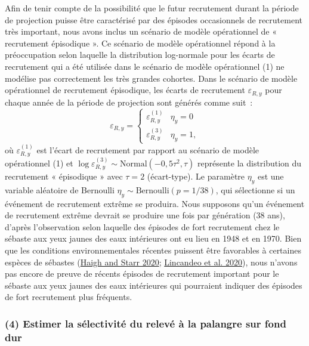 \documentclass[11pt]{book}
\begin{document}
Afin de tenir compte de la possibilité que le futur recrutement durant la période de projection puisse être caractérisé par des épisodes occasionnels de recrutement très important, nous avons inclus un scénario de modèle opérationnel de « recrutement épisodique ». Ce scénario de modèle opérationnel répond à la préoccupation selon laquelle la distribution log-normale pour les écarts de recrutement qui a été utilisée dans le scénario de modèle opérationnel (1) ne modélise pas correctement les très grandes cohortes. Dans le scénario de modèle opérationnel de recrutement épisodique, les écarts de recrutement \(\varepsilon_{R,y}\) pour chaque année de la période de projection sont générés comme suit~:
\begin{equation}
\varepsilon_{R,y} = 
\left\{
\begin{array}{ll}
\varepsilon^{(1)}_{R,y} & \eta_y = 0\\
\varepsilon^{(3)}_{R,y} & \eta_y = 1,
\end{array}
\right.
\end{equation}
où \(\varepsilon^{(1)}_{R,y}\) est l'écart de recrutement par rapport au scénario de modèle opérationnel (1) et \(\log\varepsilon^{(3)}_{R,y} \sim \textrm{Normal}(-0,5\tau^2, \tau)\) représente la distribution du recrutement « épisodique » avec \(\tau = 2\) (écart-type). Le paramètre \(\eta_y\) est une variable aléatoire de Bernoulli \(\eta_y \sim \textrm{Bernoulli}(p = 1/38)\), qui sélectionne si un événement de recrutement extrême se produira. Nous supposons qu'un événement de recrutement extrême devrait se produire une fois par génération (38 ans), d'après l'observation selon laquelle des épisodes de fort recrutement chez le sébaste aux yeux jaunes des eaux intérieures ont eu lieu en 1948 et en 1970. Bien que les conditions environnementales récentes puissent être favorables à certaines espèces de sébastes (\protect\hyperlink{ref-haigh2020}{Haigh and Starr 2020}; \protect\hyperlink{ref-lincandeo2020}{Lincandeo et al. 2020}), nous n'avons pas encore de preuve de récents épisodes de recrutement important pour le sébaste aux yeux jaunes des eaux intérieures qui pourraient indiquer des épisodes de fort recrutement plus fréquents.

\hypertarget{sec:approach3-reference4}{%
\subsubsection{(4) Estimer la sélectivité du relevé à la palangre sur fond dur}\label{sec:approach3-reference4}}
\end{document}
